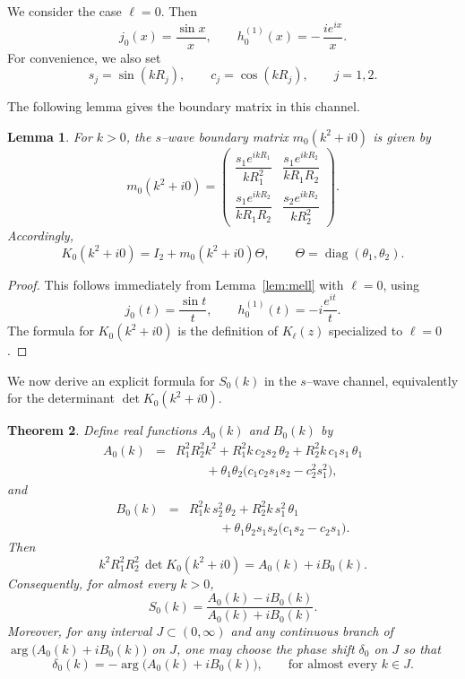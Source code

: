 \documentclass[a4paper,11pt]{article}
\numberwithin{equation}{section}
\newcommand{\diag}{\operatorname{diag}}
\newcommand{\jj}[1]{j_{#1}}
\newcommand{\hj}[1]{h^{(1)}_{#1}}
\newtheorem{thm}{Theorem}[section]
\newtheorem{lem}[thm]{Lemma}
\theoremstyle{definition}
\theoremstyle{remark}
\begin{document}
We consider the case $\ell=0$. Then
$$
\jj{0}(x)=\frac{\sin x}{x},
\qquad
\hj{0}(x)=-\,\frac{i e^{ix}}{x}.
$$
For convenience, we also set
$$
s_j=\sin(kR_j),
\qquad
c_j=\cos(kR_j),
\qquad
j=1,2.
$$

The following lemma gives the boundary matrix in this channel.

\begin{lem}\label{lem:m0}
For $k>0$, the $s$--wave boundary matrix $m_0(k^2+i0)$ is given by
$$
m_0(k^2+i0)
=
\left(
\begin{array}{cc}
\dfrac{s_1e^{ikR_1}}{kR_1^2} &
\dfrac{s_1e^{ikR_2}}{kR_1R_2}
\\[12pt]
\dfrac{s_1e^{ikR_2}}{kR_1R_2} &
\dfrac{s_2e^{ikR_2}}{kR_2^2}
\end{array}
\right).
$$
Accordingly,
$$
K_0(k^2+i0)=I_2+m_0(k^2+i0)\Theta,
\qquad
\Theta=\diag(\theta_1,\theta_2).
$$
\end{lem}

\begin{proof}
This follows immediately from Lemma~\ref{lem:mell} with $\ell=0$, using
$$
j_0(t)=\frac{\sin t}{t},
\qquad
h_0^{(1)}(t)=-i\frac{e^{it}}{t}.
$$
The formula for $K_0(k^2+i0)$ is the definition of $K_\ell(z)$ specialized to
$\ell=0$.
\end{proof}

We now derive an explicit formula for $S_0(k)$ in the $s$--wave channel,
equivalently for the determinant $\det K_0(k^2+i0)$.

\begin{thm}
\label{thm:S0}
Define real functions $A_0(k)$ and $B_0(k)$ by
\begin{eqnarray}
A_0(k)
&=&
R_1^2R_2^2k^2
+
R_1^2k\,c_2s_2\,\theta_2
+
R_2^2k\,c_1s_1\,\theta_1
\nonumber\\
&&\hspace{1cm}
+
\theta_1\theta_2
\bigl(c_1c_2s_1s_2-c_2^2s_1^2\bigr),
\label{eq:A0}
\end{eqnarray}
and
\begin{eqnarray}
B_0(k)
&=&
R_1^2k\,s_2^2\,\theta_2
+
R_2^2k\,s_1^2\,\theta_1
\nonumber\\
&&\hspace{1cm}
+
\theta_1\theta_2
s_1s_2\bigl(c_1s_2-c_2s_1\bigr).
\label{eq:B0}
\end{eqnarray}
Then
\begin{equation}\label{eq:scaled-det}
k^2R_1^2R_2^2\,\det K_0(k^2+i0)=A_0(k)+iB_0(k).
\end{equation}
Consequently, for almost every $k>0$,
\begin{equation}\label{eq:S0}
S_0(k)=\frac{A_0(k)-iB_0(k)}{A_0(k)+iB_0(k)}.
\end{equation}
Moreover, for any interval $J\subset(0,\infty)$ and any continuous branch of
$\arg\bigl(A_0(k)+iB_0(k)\bigr)$ on $J$, one may choose the phase shift
$\delta_0$ on $J$ so that
\begin{equation}\label{eq:delta0}
\delta_0(k)
=
-\arg\bigl(A_0(k)+iB_0(k)\bigr),
\qquad \mbox{for almost every~} k\in J.
\end{equation}
\end{thm}
\end{document}
